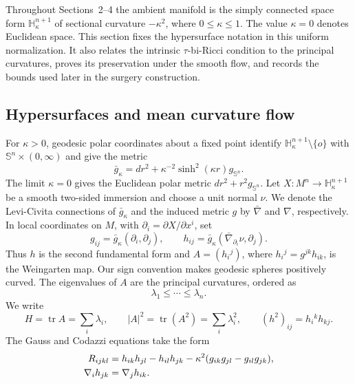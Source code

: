 \documentclass[11pt,reqno]{amsart}
\theoremstyle{definition}
\theoremstyle{remark}
\numberwithin{equation}{section}
\newcommand{\Hh}{\mathbb H}
\newcommand{\Sph}{\mathbb S}
\newcommand{\tr}{\operatorname{tr}}
\begin{document}
Throughout Sections~2--4 the ambient manifold is the simply connected space form $\Hh^{n+1}_{\kappa}$ of sectional curvature $-\kappa^2$, where $0\leq\kappa\leq1$. The value $\kappa=0$ denotes Euclidean space. This section fixes the hypersurface notation in this uniform normalization. It also relates the intrinsic $\tau$-bi-Ricci condition to the principal curvatures, proves its preservation under the smooth flow, and records the bounds used later in the surgery construction.

\subsection{Hypersurfaces and mean curvature flow}

For $\kappa>0$, geodesic polar coordinates about a fixed point identify
$\Hh^{n+1}_{\kappa}\setminus\{o\}$ with
$\Sph^n\times(0,\infty)$ and give the metric
\begin{equation*}
 \bar g_{\kappa}=dr^2+\kappa^{-2}\sinh^2(\kappa r)g_{\Sph^n}.
\end{equation*}
The limit $\kappa=0$ gives the Euclidean polar metric
$dr^2+r^2g_{\Sph^n}$.  
Let $X:M^n\to\Hh^{n+1}_{\kappa}$ be a smooth two-sided immersion and choose a
unit normal $\nu$.  We denote the Levi-Civita connections of $\bar g_\kappa$
and the induced metric $g$ by $\bar\nabla$ and $\nabla$, respectively.  In
local coordinates on $M$, with $\partial_i=\partial X/\partial x^i$, set
\begin{equation*}
 g_{ij}=\bar g_\kappa(\partial_i,\partial_j),
 \qquad
 h_{ij}=\bar g_\kappa(\bar\nabla_{\partial_i}\nu,\partial_j).
\end{equation*}
Thus $h$ is the second fundamental form and
$A=(h_i{}^j)$, where $h_i{}^j=g^{jk}h_{ik}$, is the Weingarten map.  Our sign
convention makes geodesic spheres positively curved.  The eigenvalues of $A$
are the principal curvatures, ordered as
\begin{equation*}
 \lambda_1\leq\cdots\leq\lambda_n.
\end{equation*}
We write
\begin{equation*}
 H=\tr A=\sum_i\lambda_i,
 \qquad
 |A|^2=\tr(A^2)=\sum_i\lambda_i^2,
 \qquad
 (h^2)_{ij}=h_i{}^kh_{kj}.
\end{equation*}
The Gauss and Codazzi equations take the form
\begin{align}
 R_{ijkl}
 &=h_{ik}h_{jl}-h_{il}h_{jk}
   -\kappa^2(g_{ik}g_{jl}-g_{il}g_{jk}),
   \label{eq:gauss-space-form}\\
 \nabla_i h_{jk}&=\nabla_jh_{ik}.\notag
\end{align}
\end{document}
